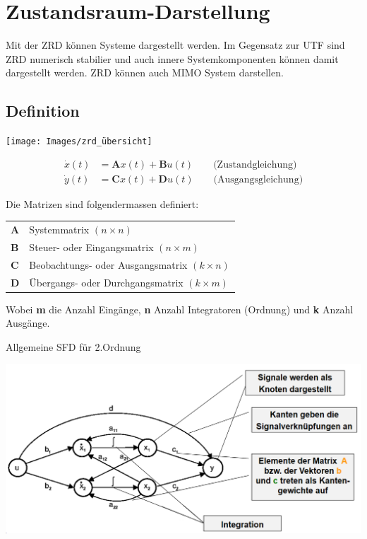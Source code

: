 \section{Zustandsraum-Darstellung}
Mit der ZRD können Systeme dargestellt werden. Im Gegensatz zur UTF sind ZRD numerisch stabilier und auch innere Systemkomponenten können damit dargestellt werden. ZRD können auch MIMO System darstellen.

\subsection{Definition}
\texttt{[image: Images/zrd\_übersicht]}

\begin{align*}
	\dot{x}(t) &= \mathbf{A}x(t) + \mathbf{B}u(t) \qquad \text{(Zustandgleichung)} \\
	\dot{y}(t) &= \mathbf{C}x(t) + \mathbf{D}u(t) \qquad \text{(Ausgangsgleichung)}
\end{align*}

Die Matrizen sind folgendermassen definiert:\\
\begin{tabular}{ll}
	\textbf{A} & Systemmatrix $(n\times n)$ \\
	\textbf{B} & Steuer- oder Eingangsmatrix $(n \times m)$ \\
	\textbf{C} & Beobachtungs- oder Ausgangsmatrix $(k\times n)$ \\
	\textbf{D} & Übergangs- oder Durchgangsmatrix $(k\times m)$
\end{tabular}

Wobei \textbf{m} die Anzahl Eingänge, \textbf{n} Anzahl Integratoren (Ordnung) und \textbf{k} Anzahl Ausgänge.

\noindent Allgemeine SFD für 2.Ordnung
\begin{center}
	\includegraphics[width=\columnwidth]{Images/zrd}
\end{center}

